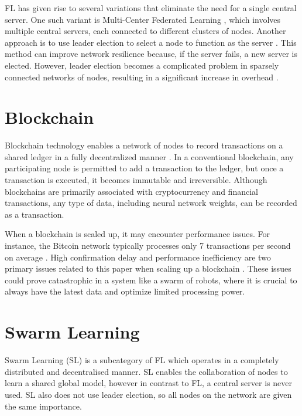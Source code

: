 FL has given rise to several variations that eliminate the need for a single central server. One such variant is Multi-Center Federated Learning \cite{multi_center_fed_learning}, which involves multiple central servers, each connected to different clusters of nodes. Another approach is to use leader election to select a node to function as the server \cite{fed_leaderelec}. This method can improve network resilience because, if the server fails, a new server is elected. However, leader election becomes a complicated problem in sparsely connected networks of nodes, resulting in a significant increase in overhead \cite{leaderelec_car}.

\section{Blockchain} \label{bg:bc}
Blockchain technology enables a network of nodes to record transactions on a shared ledger in a fully decentralized manner \cite{blockchain_review}. In a conventional blockchain, any participating node is permitted to add a transaction to the ledger, but once a transaction is executed, it becomes immutable and irreversible. Although blockchains are primarily associated with cryptocurrency and financial transactions, any type of data, including neural network weights, can be recorded as a transaction.

When a blockchain is scaled up, it may encounter performance issues. For instance, the Bitcoin network typically processes only 7 transactions per second on average \cite{blockchain_scale}. High confirmation delay and performance inefficiency are two primary issues related to this paper when scaling up a blockchain \cite{blockchain_scale}. These issues could prove catastrophic in a system like a swarm of robots, where it is crucial to always have the latest data and optimize limited processing power.

\section{Swarm Learning}
Swarm Learning (SL) is a subcategory of FL which operates in a completely distributed and decentralised manner. SL enables the collaboration of nodes to learn a shared global model, however in contrast to FL, a central server is never used. SL also does not use leader election, so all nodes on the network are given the same importance.

